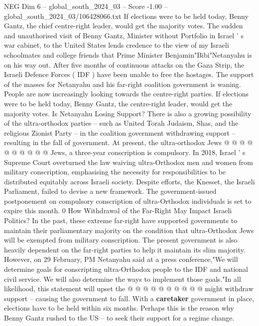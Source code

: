 \begin{textsample}{NEG Dim 6 – global\_south\_2024\_03 – Score -1.00 – global\_south\_2024\_03/106428066.txt}  \label{ex:f6_neg_406}
If elections were to be held today, Benny Gantz, the chief centre-right leader, would get the majority votes.
The sudden and unauthorised visit of Benny Gantz, Minister without Portfolio in Israel ' s war cabinet, to the United States lends credence to the view of my Israeli schoolmates and college friends that Prime Minister Benjamin"Bibi"Netanyahu is on his way out.
After five months of continuous attacks on the Gaza Strip, the Israeli Defence Forces ( IDF ) have been unable to free the hostages.
The support of the masses for Netanyahu and his far-right coalition government is waning.
People are now increasingly looking towards the centre-right parties.
If elections were to be held today, Benny Gantz, the centre-right leader, would get the majority votes.
Is Netanyahu Losing Support?
There is also a growing possibility of the ultra-orthodox parties -- such as United Torah Judaism, Shas, and the religious Zionist Party -- in the coalition government withdrawing support -- resulting in the fall of government.
At present, the ultra-orthodox Jews @ @ @ @ @ @ @ @ @ @ Jews, a three-year conscription is compulsory.
In 2018, Israel ' s Supreme Court overturned the law waiving ultra-Orthodox men and women from military conscription, emphasising the necessity for responsibilities to be distributed equitably across Israeli society.
Despite efforts, the Knesset, the Israeli Parliament, failed to devise a new framework.
The government-issued postponement on compulsory conscription of ultra-Orthodox individuals is set to expire this month. 0 How Withdrawal of the Far-Right May Impact Israeli Politics?
In the past, these extreme far-right have supported governments to maintain their parliamentary majority on the condition that ultra-Orthodox Jews will be exempted from military conscription.
The present government is also heavily dependent on the far-right parties to help it maintain its slim majority.
However, on 29 February, PM Netanyahu said at a press conference,"We will determine goals for conscripting ultra-Orthodox people to the IDF and national civil service.
We will also determine the ways to implement those goals."In all likelihood, this statement will upset the @ @ @ @ @ @ @ @ @ @ might withdraw support -- causing the government to fall.
With a \textbf{caretaker} government in place, elections have to be held within six months.
Perhaps this is the reason why Benny Gantz rushed to the US -- to seek their support for a regime change.

\end{textsample}
